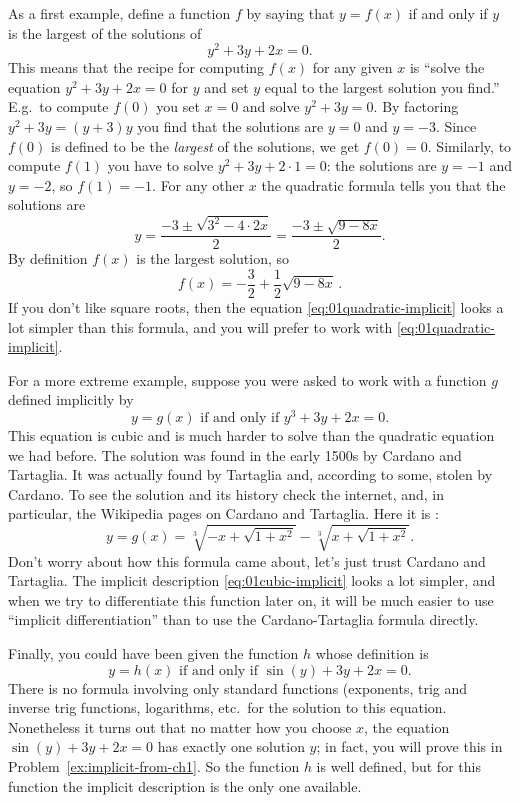 As a first example, define a function $f$ by saying that $y=f(x)$ if
and only if $y$ is the largest of the solutions of
\begin{equation}\label{eq:01quadratic-implicit}
  y^2+3y+2x = 0.
\end{equation}
This means that the recipe for computing $f(x)$ for any given $x$ is
``solve the equation $y^2+3y+2x = 0$ for $y$ and set $y$ equal to the
largest solution you find.''  E.g.\ to compute $f(0)$ you set $x=0$
and solve $y^2+3y=0$.  By factoring $y^2+3y = (y+3)y$ you find that
the solutions are $y=0$ and $y=-3$.  Since $f(0)$ is defined to be the
\textit{largest} of the solutions, we get $f(0)=0$.  Similarly, to
compute $f(1)$ you have to solve $y^2+3y +2\cdot1=0$: the solutions
are $y=-1$ and $y=-2$, so $f(1) = -1 $.  For any other $x$ the
quadratic formula tells you that the solutions are
\[
y = \frac{-3 \pm \sqrt{3^2-4\cdot 2x}} {2} = \frac{-3\pm\sqrt{9-8x}} {2}.
\]
By definition $f(x)$ is the largest solution, so
\[
f(x) = -\frac{3} {2} + \frac{1} {2}\sqrt{9-8x} \, .
\]
If you don't like square roots, then the equation
\eqref{eq:01quadratic-implicit} looks a lot simpler than this formula,
and you will prefer to work with \eqref{eq:01quadratic-implicit}.

For a more extreme example, suppose you were asked to work with a
function $g$ defined implicitly by
\begin{equation}\label{eq:01cubic-implicit}
  y=g(x) \text{ if and only if } y^3+3y+2x = 0.
\end{equation}
This equation is cubic and is much harder to solve than the quadratic
equation we had before.  The solution was found in the early 1500s by
Cardano and Tartaglia.  It was actually found by Tartaglia and,
according to some, stolen by Cardano.  To see the solution and its
history check the internet, and, in particular, the Wikipedia pages on
Cardano and Tartaglia.  Here it is :
\[
y = g(x) = \sqrt[3]{-x+\sqrt{1+x^2}}-\sqrt[3]{x+\sqrt{1+x^2}}.
\]
Don't worry about how this formula came about, let's just trust
Cardano and Tartaglia.  The implicit description
\eqref{eq:01cubic-implicit} looks a lot simpler, and when we try to
differentiate this function later on, it will be much easier to use
``implicit differentiation'' than to use the Cardano-Tartaglia formula
directly.

Finally, you could have been given the function $h$ whose definition is
\begin{equation}\label{eq:01transcendental-implicit}
  y=h(x) \text{ if and only if } \sin(y)+3y+2x = 0.
\end{equation}
There is no formula involving only standard functions (exponents, trig
and inverse trig functions, logarithms, etc.~for the solution to this
equation.  Nonetheless it turns out that no matter how you choose $x$,
the equation $\sin(y)+3y+2x=0$ has exactly one solution $y$; in fact,
you will prove this in Problem~\ref{ex:implicit-from-ch1}.  So the
function $h$ is well defined, but for this function the implicit
description is the only one available.

